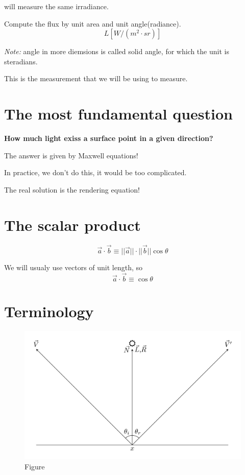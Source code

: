\documentclass[
]{book}
\begin{document}
will measure the same irradiance.

Compute the flux by unit area and unit angle(radiance).
\[L\left[W/\left(m^2\cdot sr\right)\right]\]

\emph{Note:} angle in more diemsions is called solid angle, for which the unit is
steradians.

This is the measurement that we will be using to measure.

\hypertarget{the-most-fundamental-question}{%
\section{The most fundamental question}\label{the-most-fundamental-question}}

\textbf{How much light exiss a surface point in a given direction?}

The answer is given by Maxwell equations!

In practice, we don't do this, it would be too complicated.

The real solution is the rendering equation!

\hypertarget{the-scalar-product}{%
\section{The scalar product}\label{the-scalar-product}}

\[
\vec{a}\cdot\vec{b}\equiv||\vec{a}||\cdot||\vec{b}||\cos\theta
\]

We will usualy use vectors of unit length, so
\[
\vec{a}\cdot\vec{b}\equiv\cos\theta
\]

\hypertarget{terminology}{%
\section{Terminology}\label{terminology}}

\begin{figure}
\centering
\includegraphics{figures/02_1.png}
\caption{Figure}
\end{figure}
\end{document}
